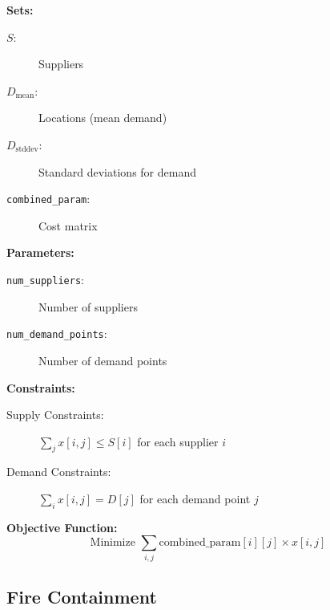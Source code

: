 \documentclass[lettersize,journal]{IEEEtran}
\begin{document}
\textbf{Sets:}
\begin{description}
  \item[$S$:] Suppliers
  \item[$D_{\text{mean}}$:] Locations (mean demand)
  \item[$D_{\text{stddev}}$:] Standard deviations for demand
  \item[\texttt{combined\_param}:] Cost matrix
\end{description}

\textbf{Parameters:}
\begin{description}
  \item[\texttt{num\_suppliers}:] Number of suppliers
  \item[\texttt{num\_demand\_points}:] Number of demand points
\end{description}

\textbf{Constraints:}
\begin{description}
  \item[Supply Constraints:] $\sum_{j} x[i, j] \leq S[i]$ for each supplier $i$
  \item[Demand Constraints:] $\sum_{i} x[i, j] = D[j]$ for each demand point $j$
\end{description}

\textbf{Objective Function:}
\begin{equation}
    \text{Minimize } \sum_{i,j} \text{combined\_param}[i][j] \times x[i, j]
\end{equation}





\subsection{Fire Containment}\label{Fire Containment}
\end{document}
